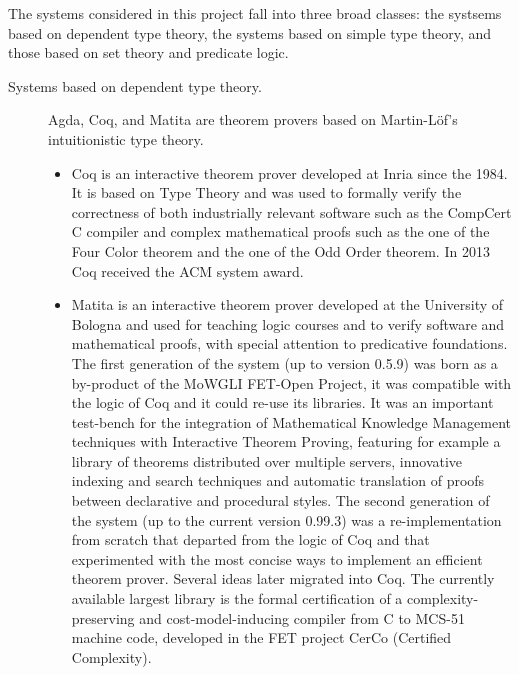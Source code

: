 The systems considered in this project fall into three broad classes:
the systsems based on dependent type theory, the systems based on
simple type theory, and those based on set theory and predicate logic. 
\begin{description}

  \item[Systems based on dependent type theory.] Agda, Coq, and Matita
  are theorem provers based on Martin-L\"of's intuitionistic type
  theory.

  \begin{itemize}
    \item Coq is an interactive theorem prover developed at Inria
    since the 1984.  It is based on Type Theory and was used to
    formally verify the correctness of both industrially relevant
    software such as the CompCert C compiler and complex mathematical
    proofs such as the one of the Four Color theorem and the one of
    the Odd Order theorem. In 2013 Coq received the ACM system award.

    \item Matita is an interactive theorem prover developed at the
    University of Bologna and used for teaching logic courses and to
    verify software and mathematical proofs, with special attention to
    predicative foundations. The first generation of the system (up to
    version 0.5.9) was born as a by-product of the MoWGLI FET-Open
    Project, it was compatible with the logic of Coq and it could
    re-use its libraries. It was an important test-bench for the
    integration of Mathematical Knowledge Management techniques with
    Interactive Theorem Proving, featuring for example a library of
    theorems distributed over multiple servers, innovative indexing
    and search techniques and automatic translation of proofs between
    declarative and procedural styles. The second generation of the
    system (up to the current version 0.99.3) was a re-implementation
    from scratch that departed from the logic of Coq and that
    experimented with the most concise ways to implement an efficient
    theorem prover. Several ideas later migrated into Coq. The
    currently available largest library is the formal certification of
    a complexity-preserving and cost-model-inducing compiler from C to
    MCS-51 machine code, developed in the FET project CerCo (Certified
    Complexity).


\end{itemize}
\end{description}
